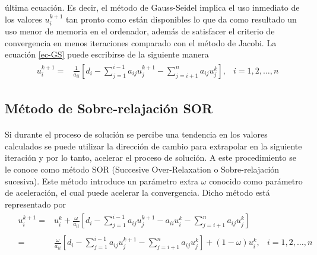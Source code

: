 \documentclass[letterpaper, openright, 12pt]{book}
\begin{document}
        última ecuación. Es decir, el método de Gauss-Seidel implica el uso
        inmediato de los valores $u_{i}^{k+1}$ tan pronto como están disponibles
        lo que da como resultado un uso menor de memoria en el ordenador, además
        de satisfacer el criterio de convergencia en menos iteraciones comparado
        con el método de Jacobi. La ecuación \ref{ec-GS} puede escribirse de la
        siguiente manera
        \begin{align}
            &\begin{aligned}
                u_{i}^{k+1} =& \frac{1}{a_{ii}} \left[ d_{i} - \sum_{j=1}^{i-1} a_{ij}u_{j}^{k+1}  - \sum_{j = i + 1}^{n} a_{ij}u_{j}^{k} \right], &i = 1, 2, \dotsc, n
            \end{aligned}
            \label{ec-GS-2}
        \end{align}
    \subsection{Método de Sobre-relajación SOR}
    \paragraph*{}
        Si durante el proceso de solución se percibe una tendencia en los
        valores calculados se puede utilizar la dirección de cambio para
        extrapolar en la siguiente iteración y por lo tanto, acelerar el
        proceso de solución. A este procedimiento se le conoce como método SOR
        (Succesive Over-Relaxation o  Sobre-relajación sucesiva). Este método
        introduce un parámetro extra $\omega$ conocido como parámetro de
        aceleración, el cual puede acelerar la convergencia. Dicho método está
        representado por
        \begin{align}
            &\begin{aligned}
                u_{i}^{k+1} =& u_{i}^{k} + \frac{\omega}{a_{ii}} \left[ d_{i} - \sum_{j = 1}^{i - 1}a_{ij}u_{j}^{k+1} - a_{ii}u_{i}^{k} - \sum_{j = i+1}^{n} a_{ij}u_{j}^{k} \right]
                \\ \\
                =& \frac{\omega}{a_{ii}} \left[ d_{i} - \sum_{j = 1}^{i - 1} a_{ij}u_{j}^{k+1} - \sum_{j = i+1}^{n} a_{ij}u_j ^{k}\right] + \left( 1 - \omega \right) u_{i}^{k}, &i = 1, 2, \dotsc, n
            \end{aligned}
        \end{align}
\end{document}
